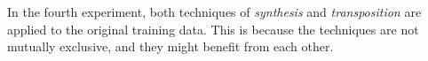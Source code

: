 
In the fourth experiment, both techniques of
\emph{synthesis} and \emph{transposition} are applied to the
original training data. This is because the techniques are
not mutually exclusive, and they might benefit from each
other.

